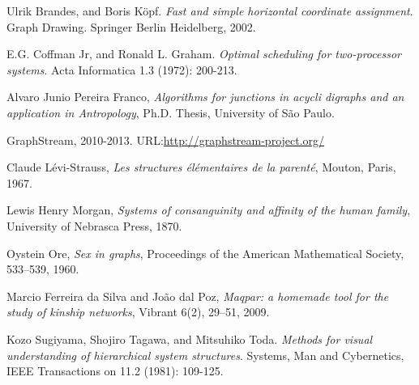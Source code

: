 \documentclass[a4paper,10pt]{article}
\begin{document}
\begin{thebibliography}{9}

  Ulrik Brandes, and Boris Köpf. \emph{Fast and simple horizontal coordinate assignment}.
  Graph Drawing. Springer Berlin Heidelberg, 2002.
  
   E.G. Coffman Jr, and Ronald L. Graham. 
  \emph{Optimal scheduling for two-processor systems}. 
  Acta Informatica 1.3 (1972): 200-213.

Alvaro Junio Pereira Franco, \emph{Algorithms for junctions in acycli
  digraphs and an application in Antropology}, Ph.D. Thesis,
University of São Paulo. 

  GraphStream,
  2010-2013.
  URL:\url{http://graphstream-project.org/}

Claude Lévi-Strauss, 
\emph{Les structures élémentaires de la parenté}, Mouton, Paris, 1967.

 Lewis Henry Morgan, 
\emph{Systems of consanguinity and affinity of the human family},
University of Nebrasca Press, 1870. 

Oystein Ore, 
\emph{Sex in graphs}, Proceedings of the American Mathematical
Society, 533--539, 1960. 

Marcio Ferreira da Silva and João dal Poz, 
\emph{Maqpar: a homemade tool for the study of kinship networks},
Vibrant 6(2), 29--51, 2009. 

 Kozo Sugiyama, Shojiro Tagawa, and Mitsuhiko Toda.
  \emph{Methods for visual understanding of hierarchical system structures}.
  Systems, Man and Cybernetics,
  IEEE Transactions on 11.2 (1981): 109-125.

\end{thebibliography}
\end{document}
